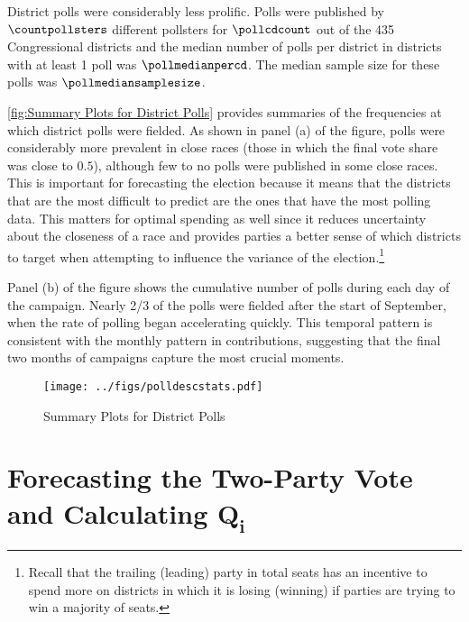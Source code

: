 \documentclass[12pt,final,fleqn]{article}
\theoremstyle{plain}
\begin{document}
District polls were considerably less prolific. Polls were published by $\countpollsters$ different pollsters for $\pollcdcount$ out of the 435 Congressional districts and the median number of polls per district in districts with at least 1 poll was $\pollmedianpercd$. The median sample size for these polls was $\pollmediansamplesize$. 

\autoref{fig:Summary Plots for District Polls} provides summaries of the frequencies at which district polls were fielded. As shown in panel (a) of the figure, polls were considerably more prevalent in close races (those in which the final vote share was close to $0.5$), although few to no polls were published in some close races. This is important for forecasting the election because it means that the districts that are the most difficult to predict are the ones that have the most polling data. This matters for optimal spending as well since it reduces uncertainty about the closeness of a race and provides parties a better sense of which districts to target when attempting to influence the variance of the election.\footnote{Recall that the trailing (leading) party in total seats has an incentive to spend more on districts in which it is losing (winning) if parties are trying to win a majority of seats.}

Panel (b) of the figure shows the cumulative number of polls during each day of the campaign. Nearly 2/3 of the polls were fielded after the start of September, when the rate of polling began accelerating quickly. This temporal pattern is consistent with the monthly pattern in contributions, suggesting that the final two months of campaigns capture the most crucial moments.

\begin{figure}[!htb]
\centering
\texttt{[image: ../figs/polldescstats.pdf]}
\vspace{.5cm}
\caption{Summary Plots for District Polls}
\label{fig:Summary Plots for District Polls}
\end{figure}

\section{Forecasting the Two-Party Vote and Calculating $\mathbf{Q_i}$}
\end{document}
